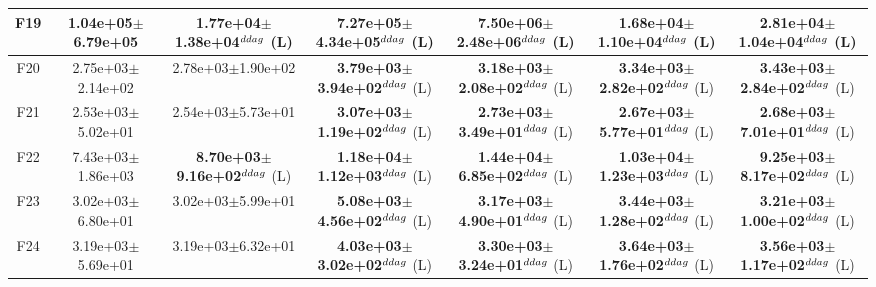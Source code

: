 \begin{table}[!t]
\begin{tabular}{c|cccccc}
F19  & 1.04e+05$\pm$6.79e+05  & 1.77e+04$\pm$1.38e+04$^{\\ddag}$ (L)  & \textbf{7.27e+05$\pm$4.34e+05}$^{\\ddag}$ (L)  & \textbf{7.50e+06$\pm$2.48e+06}$^{\\ddag}$ (L)  & 1.68e+04$\pm$1.10e+04$^{\\ddag}$ (L)  & 2.81e+04$\pm$1.04e+04$^{\\ddag}$ (L) \\ \hline
F20  & 2.75e+03$\pm$2.14e+02  & 2.78e+03$\pm$1.90e+02   & \textbf{3.79e+03$\pm$3.94e+02}$^{\\ddag}$ (L)  & \textbf{3.18e+03$\pm$2.08e+02}$^{\\ddag}$ (L)  & \textbf{3.34e+03$\pm$2.82e+02}$^{\\ddag}$ (L)  & \textbf{3.43e+03$\pm$2.84e+02}$^{\\ddag}$ (L) \\ \hline
F21  & 2.53e+03$\pm$5.02e+01  & 2.54e+03$\pm$5.73e+01   & \textbf{3.07e+03$\pm$1.19e+02}$^{\\ddag}$ (L)  & \textbf{2.73e+03$\pm$3.49e+01}$^{\\ddag}$ (L)  & \textbf{2.67e+03$\pm$5.77e+01}$^{\\ddag}$ (L)  & \textbf{2.68e+03$\pm$7.01e+01}$^{\\ddag}$ (L) \\ \hline
F22  & 7.43e+03$\pm$1.86e+03  & \textbf{8.70e+03$\pm$9.16e+02}$^{\\ddag}$ (L)  & \textbf{1.18e+04$\pm$1.12e+03}$^{\\ddag}$ (L)  & \textbf{1.44e+04$\pm$6.85e+02}$^{\\ddag}$ (L)  & \textbf{1.03e+04$\pm$1.23e+03}$^{\\ddag}$ (L)  & \textbf{9.25e+03$\pm$8.17e+02}$^{\\ddag}$ (L) \\ \hline
F23  & 3.02e+03$\pm$6.80e+01  & 3.02e+03$\pm$5.99e+01   & \textbf{5.08e+03$\pm$4.56e+02}$^{\\ddag}$ (L)  & \textbf{3.17e+03$\pm$4.90e+01}$^{\\ddag}$ (L)  & \textbf{3.44e+03$\pm$1.28e+02}$^{\\ddag}$ (L)  & \textbf{3.21e+03$\pm$1.00e+02}$^{\\ddag}$ (L) \\ \hline
F24  & 3.19e+03$\pm$5.69e+01  & 3.19e+03$\pm$6.32e+01   & \textbf{4.03e+03$\pm$3.02e+02}$^{\\ddag}$ (L)  & \textbf{3.30e+03$\pm$3.24e+01}$^{\\ddag}$ (L)  & \textbf{3.64e+03$\pm$1.76e+02}$^{\\ddag}$ (L)  & \textbf{3.56e+03$\pm$1.17e+02}$^{\\ddag}$ (L) \\ \hline

\end{tabular}
\end{table}
